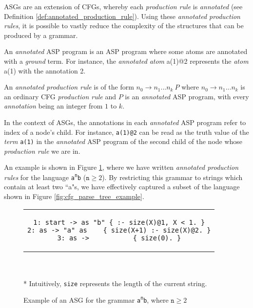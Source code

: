 \noindent
ASGs are an extension of CFGs, whereby each \textit{production rule} is \textit{annotated} (see Definition \ref{def:annotated_production_rule}). Using these \textit{annotated production rules}, it is possible to vastly reduce the complexity of the structures that can be produced by a grammar.

\begin{definition}
An \textit{annotated} ASP program is an ASP program where some atoms are annotated with a \textit{ground} term. For instance, the \textit{annotated} \textit{atom} a(1)@2 represents the \textit{atom} a(1) with the annotation 2.
\end{definition}

\begin{definition}
\label{def:annotated_production_rule}
An \textit{annotated production rule} is of the form $n_0 \to n_1 ... n_k\ P$ where $n_0 \to n_1 ... n_k$ is an ordinary CFG \textit{production rule} and $P$ is an \textit{annotated} ASP program, with every \textit{annotation} being an integer from $1$ to $k$.
\end{definition}

\noindent
In the context of ASGs, the annotations in each \textit{annotated} ASP program refer to index of a node's child. For instance, \texttt{a(1)@2} can be read as the truth value of the \textit{term} \texttt{a(1)} in the \textit{annotated} ASP program of the second child of the node whose \textit{production rule} we are in.

An example is shown in Figure \ref{fig:asg_example}, where we have written \textit{annotated production rules} for the language \texttt{a\textsuperscript{n}b} ($\texttt{n} \ge 2$). By restricting this grammar to strings which contain at least two ``a"s, we have effectively captured a subset of the language shown in Figure \ref{fig:cfg_parse_tree_example}.

\begin{figure}[H]
\centering
\begin{tabular}{c}
\begin{lstlisting}[numbers=none, basicstyle=\ttfamily, columns=fixed, basewidth=0.45em]
1: start -> as "b" { :- size(X)@1, X < 1. }
2: as -> "a" as    { size(X+1) :- size(X)@2. }
3: as ->           { size(0). }
\end{lstlisting}
\end{tabular}
\\ \leavevmode \\ * Intuitively, \texttt{size} represents the length of the current string.
\caption{Example of an ASG for the grammar \texttt{a\textsuperscript{n}b}, where $\texttt{n} \ge 2$}
\label{fig:asg_example}
\end{figure}

